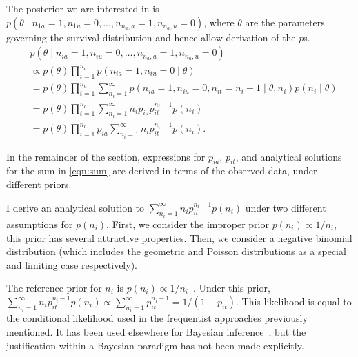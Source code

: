 \documentclass[thesis.tex]{subfiles}
\begin{document}
The posterior we are interested in is
$p(\theta \mid n_{1a} = 1, n_{1u} = 0, \dots, n_{n_a,a} = 1, n_{n_a,u} = 0)$,
where $\theta$ are the parameters governing the survival distribution
and hence allow derivation of the $p$s.
\begin{align}
&p(\theta \mid n_{ia} = 1, n_{iu} = 0, \dots, n_{n_a,a} = 1, n_{n_a,u} = 0) \\
&\propto p(\theta) \prod_{i=1}^{n_a} p(n_{ia} = 1, n_{iu} = 0 \mid \theta) \\
&= p(\theta) \prod_{i=1}^{n_a} \sum_{n_i=1}^\infty p(n_{ia} = 1, n_{iu} = 0, n_{it} = n_i - 1 \mid \theta, n_i) p(n_i \mid \theta) \\
&= p(\theta) \prod_{i=1}^{n_a} \sum_{n_i=1}^\infty n_i p_{ia} p_{it}^{n_i- 1} p(n_i) \\
&= p(\theta) \prod_{i=1}^{n_a} p_{ia} \sum_{n_i=1}^\infty n_i p_{it}^{n_i- 1} p(n_i).\label{eqn:sum}
\end{align}


In the remainder of the section, expressions for $p_{ia}$,
$p_{it}$, and analytical solutions for the sum in \cref{eqn:sum} are derived in terms of the observed data, 
under different priors.

I derive an analytical solution to $\sum_{n_i=1}^\infty n_i p_{it}^{n_i- 1} p(n_i)$ under two different assumptions for $p(n_i)$.
First, we consider the improper prior $p(n_i) \propto 1/n_i$, this prior has several attractive properties.
Then, we consider a negative binomial distribution (which includes the geometric and Poisson distributions as a special and limiting case respectively).

The reference prior for $n_i$ is $p(n_i) \propto 1/n_i$~\autocite{heBayesiana}.
Under this prior,
$\sum_{n_i=1}^\infty n_i p_{it}^{n_i- 1} p(n_i) \propto \sum_{n_i=1}^\infty p_{it}^{n_i-1} = 1/(1-p_{it})$.
This likelihood is equal to the conditional likelihood used in the frequentist approaches previously mentioned.
It has been used elsewhere for Bayesian inference~\autocite{zhouUnified}, but the justification within a Bayesian paradigm has not been made explicitly.
\end{document}
